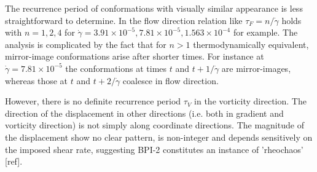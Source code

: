\documentclass[aps,pre,reprint,superscriptaddress, twocolumn]{revtex4}
\newcommand{\e}[1]{\times10^{#1}}
\newcommand{\gd}{\dot{\gamma}}
\begin{document}
The recurrence period of conformations with visually similar appearance is 
less straightforward to determine. In the flow direction relation like
$\tau_F=n/\gd$ holds with $n=1,2,4$ for $\gd=3.91\e{-5},
7.81\e{-5},1.563\e{-4}$ for example. The analysis is complicated by the fact
that for $n>1$ thermodynamically equivalent, mirror-image 
conformations arise after shorter times. For instance at $\gd=7.81\e{-5}$
the conformations at times $t$ and $t+1/\gd$ are mirror-images, whereas
those at $t$ and $t+2/\gd$ coalesce in flow direction.

However, there is no definite recurrence period $\tau_V$ 
in the vorticity direction. The direction of the displacement
in other directions (i.e. both in gradient and vorticity direction) 
is not simply along coordinate directions. 
The magnitude of the displacement show no clear pattern, is non-integer 
and depends sensitively on the imposed shear rate,
suggesting BPI-2 constitutes an instance of 'rheochaos' [ref].
\end{document}
